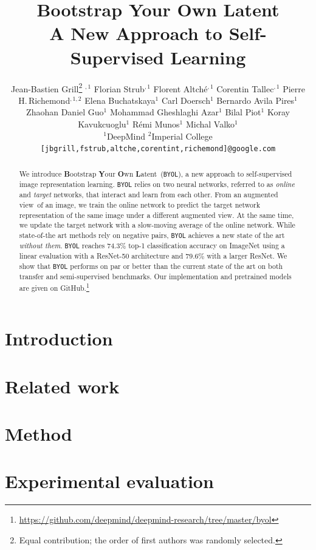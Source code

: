 \documentclass{article}
\title{Bootstrap Your Own Latent\\A New Approach to Self-Supervised Learning}
\author{%
Jean-Bastien Grill\thanks{Equal contribution; the order of first authors was randomly selected.} $^{ , 1}$ \; 
Florian Strub\footnotemark[1] $^{ , 1}$ \;
Florent Altché\footnotemark[1] $^{ , 1}$ \;
Corentin Tallec\footnotemark[1] $^{ , 1}$ \;
Pierre H.\,Richemond\footnotemark[1] $^{ ,1, 2}$ \AND
Elena Buchatskaya$^{1}$  \;
Carl Doersch$^{1}$  \;
Bernardo Avila Pires$^{1}$  \;
Zhaohan Daniel Guo$^{1}$ \AND
Mohammad Gheshlaghi Azar$^{1}$ \;
Bilal Piot$^{1}$ \;
Koray Kavukcuoglu$^{1}$ \;
Rémi Munos$^{1}$ \;
Michal Valko$^{1}$ \vspace{0.7em}\\
$^{1}$DeepMind \hspace{1cm} $^{2}$Imperial College\vspace{.7em}\\
\texttt{[jbgrill,fstrub,altche,corentint,richemond]@google.com}
}
\newcommand{\algo}{\texttt{BYOL}\xspace}
\newcommand{\augview}{augmented view}
\newcommand{\longalgo}{\textbf{B}ootstrap \textbf{Y}our \textbf{O}wn \textbf{L}atent}
\begin{document}
\maketitle

\begin{abstract}
We introduce \longalgo~(\algo), a new approach to self-supervised image representation learning. \algo relies on two neural networks, referred to as \textit{online} and \textit{target} networks, that interact and learn from each other. 
From an \augview~of an image, we train the online network to predict the target network representation of the same image under a different \augview. 
At the same time, we update the target network with a slow-moving average of the online network. 
    While state-of-the art methods rely on negative pairs, \algo achieves a new state of the art \textit{without them}. \algo reaches $74.3\%$ top-1 classification accuracy on ImageNet using a linear evaluation with a ResNet-50 architecture and $79.6\%$ with a larger ResNet. 
We show that \algo performs on par or better than the current state of the art on both transfer and semi-supervised benchmarks. Our implementation and pretrained models are given on GitHub.\setcounter{footnote}{2}\footnote{\url{https://github.com/deepmind/deepmind-research/tree/master/byol}}
\end{abstract}

\section{Introduction}
\label{sec:introduction}
\vspace{-1.3em}


\section{Related work}
\label{sec:related_work}


\section{Method}
\label{sec:method}


\section{Experimental evaluation}
\label{sec:experiments}

\end{document}
